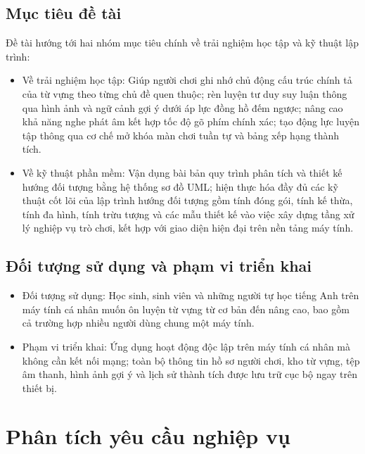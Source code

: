 \subsection{Mục tiêu đề tài}
\label{sec:objectives}
\label{subsec:objectives}
Đề tài hướng tới hai nhóm mục tiêu chính về trải nghiệm học tập và kỹ thuật lập trình:
\begin{itemize}
    \item Về trải nghiệm học tập: Giúp người chơi ghi nhớ chủ động cấu trúc chính tả của từ vựng theo từng chủ đề quen thuộc; rèn luyện tư duy suy luận thông qua hình ảnh và ngữ cảnh gợi ý dưới áp lực đồng hồ đếm ngược; nâng cao khả năng nghe phát âm kết hợp tốc độ gõ phím chính xác; tạo động lực luyện tập thông qua cơ chế mở khóa màn chơi tuần tự và bảng xếp hạng thành tích.
    \item Về kỹ thuật phần mềm: Vận dụng bài bản quy trình phân tích và thiết kế hướng đối tượng bằng hệ thống sơ đồ UML; hiện thực hóa đầy đủ các kỹ thuật cốt lõi của lập trình hướng đối tượng gồm tính đóng gói, tính kế thừa, tính đa hình, tính trừu tượng và các mẫu thiết kế vào việc xây dựng tầng xử lý nghiệp vụ trò chơi, kết hợp với giao diện hiện đại trên nền tảng máy tính.
\end{itemize}

\subsection{Đối tượng sử dụng và phạm vi triển khai}
\label{sec:scope}
\label{subsec:scope}
\begin{itemize}
    \item Đối tượng sử dụng: Học sinh, sinh viên và những người tự học tiếng Anh trên máy tính cá nhân muốn ôn luyện từ vựng từ cơ bản đến nâng cao, bao gồm cả trường hợp nhiều người dùng chung một máy tính.
    \item Phạm vi triển khai: Ứng dụng hoạt động độc lập trên máy tính cá nhân mà không cần kết nối mạng; toàn bộ thông tin hồ sơ người chơi, kho từ vựng, tệp âm thanh, hình ảnh gợi ý và lịch sử thành tích được lưu trữ cục bộ ngay trên thiết bị.
\end{itemize}

\section{Phân tích yêu cầu nghiệp vụ}
\label{sec:business_requirements}

